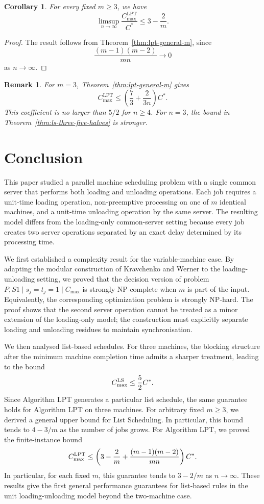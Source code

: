 \documentclass[11pt]{article}
\newtheorem{corollary}[theorem]{Corollary}
\newtheorem{remark}[theorem]{Remark}
\begin{document}
\begin{corollary}
\label{cor:lpt-asymptotic}
For every fixed \(m\ge3\), we have 
\[
        \limsup_{n\to\infty}
        \frac{C_{\max}^{\mathrm{LPT}}}{C^*}
        \le
        3-\frac2m.
\]
\end{corollary}

\begin{proof}
The result follows from Theorem~\ref{thm:lpt-general-m}, since
\[
        \frac{(m-1)(m-2)}{mn}\longrightarrow0
\]
as \(n\to\infty\).
\end{proof}

\begin{remark}
For \(m=3\), Theorem~\ref{thm:lpt-general-m} gives
\[
        C_{\max}^{\mathrm{LPT}}
        \le
        \left(\frac73+\frac{2}{3n}\right)C^*.
\]
This coefficient is no larger than \(5/2\) for \(n\ge4\). For \(n=3\), the
bound in Theorem~\ref{thm:ls-three-five-halves} is stronger.
\end{remark}

\section{Conclusion}
\label{sec:conclusion}

This paper studied a parallel machine scheduling problem with a single common server that performs both loading and unloading operations. Each job requires a unit-time loading operation, non-preemptive processing on one of $m$ identical machines, and a unit-time unloading operation by the same server. The resulting model differs from the loading-only common-server setting because every job creates two server operations separated by an exact delay determined by its processing time.

We first established a complexity result for the variable-machine case. By adapting the modular construction of Kravchenko and Werner to the loading-unloading setting, we proved that the decision version of problem 
$ P,S1\mid s_j=t_j=1\mid C_{\max}$ is strongly NP-complete when $m$ is part of the input. Equivalently, the corresponding optimization problem is strongly NP-hard. The proof shows that the second server operation cannot be treated as a minor extension of the loading-only model; the construction must explicitly separate loading and unloading residues to maintain synchronisation.

We then analysed list-based schedules. For three machines, the blocking structure after the minimum machine completion time admits a sharper treatment, leading to the bound
$$ C_{\max}^{\rm LS}\le \frac52 C^* .$$ Since Algorithm LPT generates a particular list schedule, the same guarantee holds for Algorithm LPT on three machines. For arbitrary fixed $m\ge3$, we derived a general upper bound for List Scheduling. In particular, this bound tends to $4-3/m$ as the number of jobs grows. For Algorithm LPT, we proved the finite-instance bound
$$C_{\max}^{\rm LPT}
        \le
        \left(3-\frac2m+\frac{(m-1)(m-2)}{mn}\right)C^*.$$
In particular, for each fixed \(m\), this guarantee tends to \(3-2/m\) as
\(n\to\infty\). These results give the first general performance guarantees for list-based rules in the unit loading-unloading model beyond the two-machine case.
\end{document}
